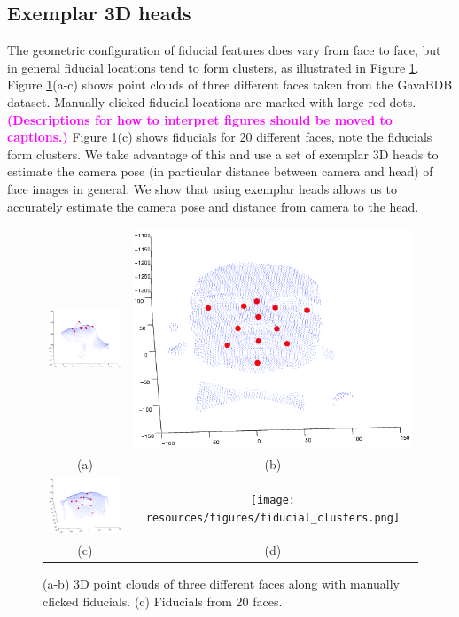 \documentclass[runningheads]{llncs}
\newcommand {\ericnote} [1] {{\bf \textcolor{magenta}{(#1)}}}
\begin{document}
\subsection{Exemplar 3D heads}
The geometric configuration of fiducial features does vary from face to face, but in general fiducial locations tend to form clusters, as illustrated in Figure \ref{fig:fiducial_clusters}.  
Figure \ref{fig:fiducial_clusters}(a-c) shows point clouds of three different faces taken from the GavaBDB \cite{moreno2004gavabdb} dataset. 
Manually clicked fiducial locations are marked with large red dots.
\ericnote{Descriptions for how to interpret figures should be moved to captions.}
Figure \ref{fig:fiducial_clusters}(c) shows fiducials for 20 different faces, note the fiducials form clusters.  
We take advantage of this and use a set of exemplar 3D heads to estimate the camera pose (in particular distance between camera and head) of face images in general. 
We show that using exemplar heads allows us to accurately estimate the camera pose and distance from camera to the head.

\begin{figure}[h]
\centering
\begin{tabular}{cc}
\includegraphics[width=.3\linewidth]{resources/figures/face1.png} &
\includegraphics[width=.3\linewidth]{resources/figures/face2.png} \\
(a) & (b) \\
\includegraphics[width=.3\linewidth]{resources/figures/face3.png} &
\texttt{[image: resources/figures/fiducial\_clusters.png]} \\
(c) & (d)
\end{tabular}
\caption{(a-b) 3D point clouds of three different faces along with manually clicked fiducials.  (c) Fiducials from 20 faces.}
\label{fig:fiducial_clusters}
\end{figure}
\end{document}
